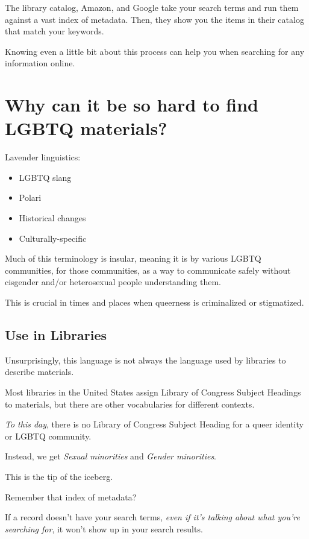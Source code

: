 \documentclass[11pt]{article}
\begin{document}
The library catalog, Amazon, and Google take your search terms and run them against a vast index of metadata.
Then, they show you the items in their catalog that match your keywords.

Knowing even a little bit about this process can help you when searching for any information online.

\section*{Why can it be so hard to find LGBTQ materials?}
\label{sec:org623a7d5}

Lavender linguistics:

\begin{itemize}
\item LGBTQ slang
\item Polari
\item Historical changes
\item Culturally-specific
\end{itemize}

Much of this terminology is insular, meaning it is by various LGBTQ communities, for those communities, as a way to communicate safely without cisgender and/or heterosexual people understanding them.

This is crucial in times and places when queerness is criminalized or stigmatized.

\subsection*{Use in Libraries}
\label{sec:org3e7b197}

Unsurprisingly, this language is not always the language used by libraries to describe materials.

Most libraries in the United States assign Library of Congress Subject Headings to materials, but there are other vocabularies for different contexts.

\emph{To this day}, there is no Library of Congress Subject Heading for a queer identity or LGBTQ community.

Instead, we get \emph{Sexual minorities} and \emph{Gender minorities}.

This is the tip of the iceberg.

Remember that index of metadata?

If a record doesn't have your search terms, \emph{even if it's talking about what you're searching for}, it won't show up in your search results.
\end{document}
